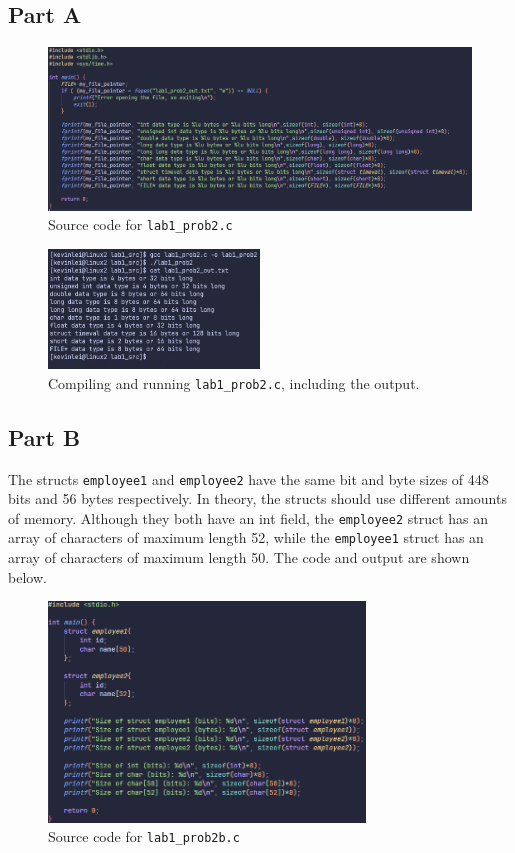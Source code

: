 \documentclass{article}
\begin{document}
\subsection{Part A}
\begin{figure}[H]
    \centering
    \includegraphics[width=1\textwidth]{./images/prob2parta1.png}
    \caption{Source code for \lstinline!lab1_prob2.c!}
\end{figure}

\begin{figure}[H]
    \centering
    \includegraphics[width=0.5\textwidth]{./images/prob2parta2.png}
    \caption{Compiling and running \lstinline!lab1_prob2.c!, including the output.}
\end{figure}

\newpage
\subsection{Part B}
The structs \lstinline!employee1! and \lstinline!employee2! have the same bit and byte sizes of  448 bits and 56 bytes respectively.
In theory, the structs should use different amounts of memory.
Although they both have an int field, the \lstinline!employee2! struct has an array of characters of maximum length 52, 
while the \lstinline!employee1! struct has an array of characters of maximum length 50.
The code and output are shown below.

\begin{figure}[H]
    \centering
    \includegraphics[width=0.75\textwidth]{./images/prob2partb1.png}
    \caption{Source code for \lstinline!lab1_prob2b.c!}
\end{figure}
\end{document}

